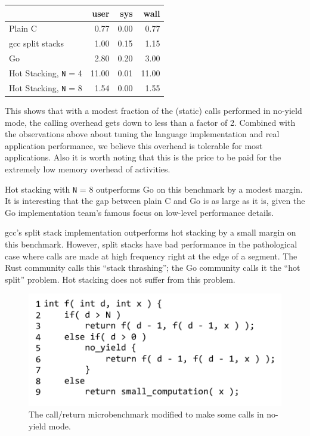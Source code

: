 \documentclass[9pt,preprint]{sigplanconf}
\begin{document}
\vspace{1em}
\begin{tabular}{|l|r|r|r|}
  \hline
   & user & sys & wall \\
  \hline
  \hline
  Plain C & 0.77 & 0.00 & 0.77 \\
  \hline
  gcc split stacks\footnotemark{} & 1.00 & 0.15 & 1.15 \\
  \hline
  Go & 2.80 & 0.20 & 3.00 \\
  \hline
  Hot Stacking, \texttt{N} = 4 & 11.00 & 0.01 & 11.00 \\
  \hline
  Hot Stacking, \texttt{N} = 8 & 1.54 & 0.00 & 1.55 \\
  \hline
\end{tabular}
\vspace{1em}


This shows that with a modest fraction of the (static) calls performed in no-yield mode, the calling overhead gets down to less than a factor of 2.
Combined with the observations above about tuning the language implementation and real application performance, we believe this overhead is tolerable for most applications.
Also it is worth noting that this is the price to be paid for the extremely low memory overhead of activities.

Hot stacking with \texttt{N} = 8 outperforms Go on this benchmark by a modest margin.
It is interesting that the gap between plain C and Go is as large as it is, given the Go implementation team's famous focus on low-level performance details.

gcc's split stack implementation outperforms hot stacking by a small margin on this benchmark.
However, split stacks have bad performance in the pathological case where calls are made at high frequency right at the edge of a segment.
The Rust community calls this ``stack thrashing''; the Go community calls it the ``hot split'' problem.
Hot stacking does not suffer from this problem.

\begin{figure}
\includegraphics{just_calling_n_benchmark}
\caption{The call/return microbenchmark modified to make some calls in no-yield mode.}
\label{fig:micro_calling_n}
\end{figure}
\end{document}
